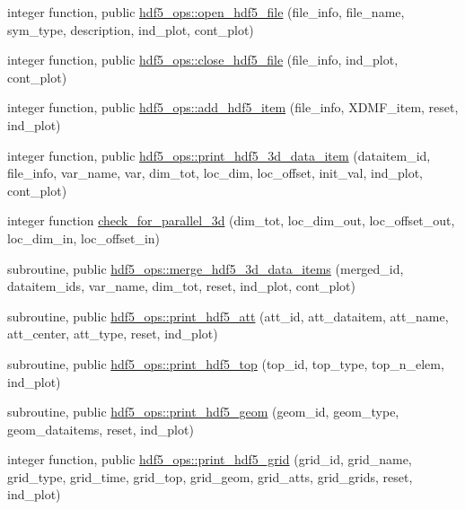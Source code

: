 \begin{DoxyCompactItemize}
\item 
integer function, public \hyperlink{namespacehdf5__ops_a28cdecb45d88592a69dada6fd5ab9919}{hdf5\+\_\+ops\+::open\+\_\+hdf5\+\_\+file} (file\+\_\+info, file\+\_\+name, sym\+\_\+type, description, ind\+\_\+plot, cont\+\_\+plot)
\item 
integer function, public \hyperlink{namespacehdf5__ops_ad6c53fff55bd71f63470ca1e525ddb56}{hdf5\+\_\+ops\+::close\+\_\+hdf5\+\_\+file} (file\+\_\+info, ind\+\_\+plot, cont\+\_\+plot)
\item 
integer function, public \hyperlink{namespacehdf5__ops_ade36dbd73b60da30e33a1059e590f734}{hdf5\+\_\+ops\+::add\+\_\+hdf5\+\_\+item} (file\+\_\+info, X\+D\+M\+F\+\_\+item, reset, ind\+\_\+plot)
\item 
integer function, public \hyperlink{namespacehdf5__ops_ad794d069ca355f28536fba7e0d21bc13}{hdf5\+\_\+ops\+::print\+\_\+hdf5\+\_\+3d\+\_\+data\+\_\+item} (dataitem\+\_\+id, file\+\_\+info, var\+\_\+name, var, dim\+\_\+tot, loc\+\_\+dim, loc\+\_\+offset, init\+\_\+val, ind\+\_\+plot, cont\+\_\+plot)
\item 
integer function \hyperlink{HDF5__ops_8f90_a80c977815900dc90dfb63bc20a2abb5e}{check\+\_\+for\+\_\+parallel\+\_\+3d} (dim\+\_\+tot, loc\+\_\+dim\+\_\+out, loc\+\_\+offset\+\_\+out, loc\+\_\+dim\+\_\+in, loc\+\_\+offset\+\_\+in)
\item 
subroutine, public \hyperlink{namespacehdf5__ops_a7b18b66402089eef2288b2d532f6af5d}{hdf5\+\_\+ops\+::merge\+\_\+hdf5\+\_\+3d\+\_\+data\+\_\+items} (merged\+\_\+id, dataitem\+\_\+ids, var\+\_\+name, dim\+\_\+tot, reset, ind\+\_\+plot, cont\+\_\+plot)
\item 
subroutine, public \hyperlink{namespacehdf5__ops_a4d0ba813f369f904a9e991804662d099}{hdf5\+\_\+ops\+::print\+\_\+hdf5\+\_\+att} (att\+\_\+id, att\+\_\+dataitem, att\+\_\+name, att\+\_\+center, att\+\_\+type, reset, ind\+\_\+plot)
\item 
subroutine, public \hyperlink{namespacehdf5__ops_af34b4aea64a8b67ec827aaf4a7425caf}{hdf5\+\_\+ops\+::print\+\_\+hdf5\+\_\+top} (top\+\_\+id, top\+\_\+type, top\+\_\+n\+\_\+elem, ind\+\_\+plot)
\item 
subroutine, public \hyperlink{namespacehdf5__ops_ac23a71e7029f46e5f38a95468fc10e22}{hdf5\+\_\+ops\+::print\+\_\+hdf5\+\_\+geom} (geom\+\_\+id, geom\+\_\+type, geom\+\_\+dataitems, reset, ind\+\_\+plot)
\item 
integer function, public \hyperlink{namespacehdf5__ops_a144d595445778d89ec1a1bc0b12a94fb}{hdf5\+\_\+ops\+::print\+\_\+hdf5\+\_\+grid} (grid\+\_\+id, grid\+\_\+name, grid\+\_\+type, grid\+\_\+time, grid\+\_\+top, grid\+\_\+geom, grid\+\_\+atts, grid\+\_\+grids, reset, ind\+\_\+plot)

\end{DoxyCompactItemize}

